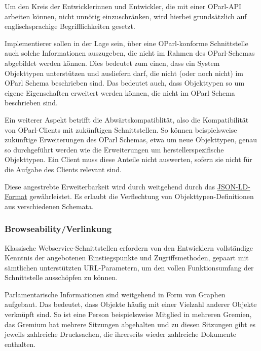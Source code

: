 \documentclass[,a4paper]{article}
\begin{document}
Um den Kreis der Entwicklerinnen und Entwickler, die mit einer OParl-API
arbeiten können, nicht unnötig einzuschränken, wird hierbei
grundsätzlich auf englischsprachige Begrifflichkeiten gesetzt.


Implementierer sollen in der Lage sein, über eine OParl-konforme
Schnittstelle auch solche Informationen auszugeben, die nicht im Rahmen
des OParl-Schemas abgebildet werden können. Dies bedeutet zum einen,
dass ein System Objekttypen unterstützen und ausliefern darf, die nicht
(oder noch nicht) im OParl Schema beschrieben sind. Das bedeutet auch,
dass Objekttypen so um eigene Eigenschaften erweitert werden können, die
nicht im OParl Schema beschrieben sind.

Ein weiterer Aspekt betrifft die Abwärtskompatiblität, also die
Kompatibilität von OParl-Clients mit zukünftigen Schnittstellen. So
können beispielsweise zukünftige Erweiterungen des OParl Schemas, etwa
um neue Objekttypen, genau so durchgeführt werden wie die Erweiterungen
um herstellerspezifische Objekttypen. Ein Client muss diese Anteile
nicht auswerten, sofern sie nicht für die Aufgabe des Clients relevant
sind.

Diese angestrebte Erweiterbarkeit wird durch weitgehend durch das
\hyperref[jsonld]{JSON-LD-Format} gewährleistet. Es erlaubt die
Verflechtung von Objekttypen-Definitionen aus verschiedenen Schemata.

\subsubsection{Browseability/Verlinkung}\label{browseabilityux5fverlinkung}

Klassische Webservice-Schnittstellen erfordern von den Entwicklern
vollständige Kenntnis der angebotenen Einstiegspunkte und
Zugriffsmethoden, gepaart mit sämtlichen unterstützten URL-Parametern,
um den vollen Funktionsumfang der Schnittstelle ausschöpfen zu können.

Parlamentarische Informationen sind weitgehend in Form von Graphen
aufgebaut. Das bedeutet, dass Objekte häufig mit einer Vielzahl anderer
Objekte verknüpft sind. So ist eine Person beispielsweise Mitglied in
mehreren Gremien, das Gremium hat mehrere Sitzungen abgehalten und zu
diesen Sitzungen gibt es jeweils zahlreiche Drucksachen, die ihrerseits
wieder zahlreiche Dokumente enthalten.
\end{document}
